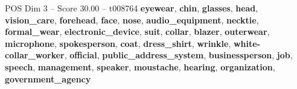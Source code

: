 \begin{textsample}{POS Dim 3 – Score 30.00 – t008764}  \label{ex:f3_pos_031}
\textbf{eyewear}, \textbf{chin}, \textbf{glasses}, \textbf{head}, \textbf{vision\_care}, \textbf{forehead}, \textbf{face}, \textbf{nose}, \textbf{audio\_equipment}, \textbf{necktie}, \textbf{formal\_wear}, \textbf{electronic\_device}, \textbf{suit}, \textbf{collar}, \textbf{blazer}, \textbf{outerwear}, \textbf{microphone}, \textbf{spokesperson}, \textbf{coat}, \textbf{dress\_shirt}, \textbf{wrinkle}, \textbf{white-collar\_worker}, \textbf{official}, \textbf{public\_address\_system}, \textbf{businessperson}, \textbf{job}, \textbf{speech}, \textbf{management}, \textbf{speaker}, \textbf{moustache}, \textbf{hearing}, \textbf{organization}, \textbf{government\_agency}

\end{textsample}
